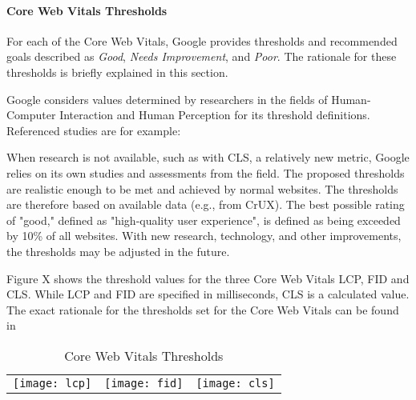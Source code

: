 
\paragraph{Core Web Vitals Thresholds} %

For each of the Core Web Vitals, Google provides thresholds and recommended goals described as \textit{Good}, \textit{Needs Improvement}, and \textit{Poor}.
The rationale for these thresholds is briefly explained in this section.

Google considers values determined by researchers in the fields of Human-Computer Interaction and Human Perception for its threshold definitions.
Referenced studies are for example:

When research is not available, such as with CLS, a relatively new metric, Google relies on its own studies and assessments from the field.
The proposed thresholds are realistic enough to be met and achieved by normal websites.
The thresholds are therefore based on available data (e.g., from CrUX).
The best possible rating of "good," defined as "high-quality user experience", is defined as being exceeded by 10\% of all websites.
With new research, technology, and other improvements, the thresholds may be adjusted in the future.

Figure X shows the threshold values for the three Core Web Vitals LCP, FID and CLS.
While LCP and FID are specified in milliseconds, CLS is a calculated value.
The exact rationale for the thresholds set for the Core Web Vitals can be found in %

\begin{table}[h]
	\centering
	\begin{tabular}{ c c c }
	\texttt{[image: lcp]} &
	\texttt{[image: fid]} &
	\texttt{[image: cls]} \\
	\end{tabular}
	\medskip
	\caption{Core Web Vitals Thresholds}
	\label{table:vitals_thresholds}
\end{table}

